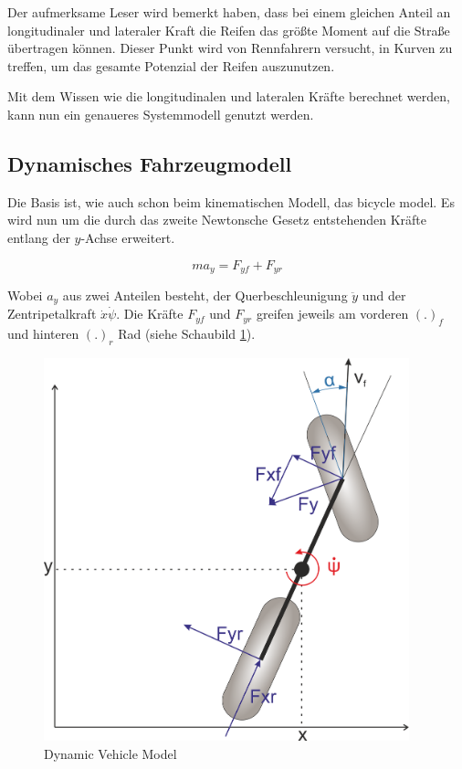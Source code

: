 \documentclass{like}
\begin{document}
Der aufmerksame Leser wird bemerkt haben, dass bei einem gleichen Anteil an longitudinaler und lateraler Kraft die Reifen das größte Moment auf die Straße übertragen können. Dieser Punkt wird von Rennfahrern versucht, in Kurven zu treffen, um das gesamte Potenzial der Reifen auszunutzen.


Mit dem Wissen wie die longitudinalen und lateralen Kräfte berechnet werden, kann nun ein genaueres Systemmodell genutzt werden.

\subsection{Dynamisches Fahrzeugmodell}
\label{dynModel}

Die Basis ist, wie auch schon beim kinematischen Modell, das bicycle model. Es wird nun um die durch das zweite Newtonsche Gesetz entstehenden Kräfte entlang der \(y\)-Achse erweitert.

\begin{equation}
ma_y = F_{yf} + F_{yr}
\end{equation}   


Wobei \(a_y\) aus zwei Anteilen besteht, der Querbeschleunigung \(\ddot{y}\) und der Zentripetalkraft \(\dot{x} \dot{\psi}\).  
Die Kräfte \(F_{yf}\) und \(F_{yr}\) greifen jeweils am vorderen \((.)_f\) und hinteren \((.)_r\) Rad (siehe Schaubild \ref{fig:dynModel}). 

\begin{figure}[hb!]
	\centering
	\includegraphics[width=300pt]{Abbildungen/dynBicycle.png}
	\caption{Dynamic Vehicle Model}
	\label{fig:dynModel}
\end{figure}
\end{document}
